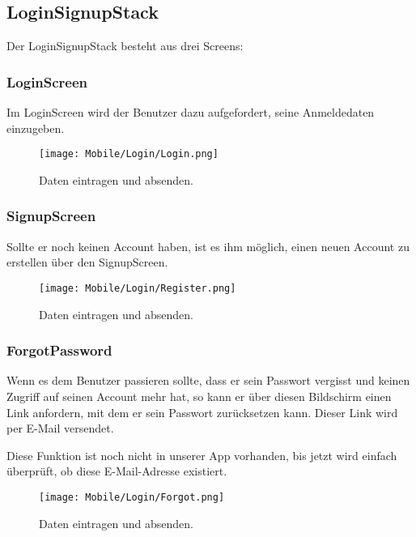 \subsection{LoginSignupStack}
Der LoginSignupStack besteht aus drei Screens:

\subsubsection{LoginScreen}
Im LoginScreen wird der Benutzer dazu aufgefordert, seine Anmeldedaten einzugeben.

\begin{figure}[H]
  \begin{center}
    \texttt{[image: Mobile/Login/Login.png]}
    \caption{Daten eintragen und absenden.}
  \end{center}
\end{figure}

\subsubsection{SignupScreen}
Sollte er noch keinen Account haben, ist es ihm möglich, einen neuen Account zu erstellen über den
SignupScreen.

\begin{figure}[H]
  \begin{center}
    \texttt{[image: Mobile/Login/Register.png]}
    \caption{Daten eintragen und absenden.}
  \end{center}
\end{figure}

\subsubsection{ForgotPassword}
Wenn es dem Benutzer passieren sollte, dass er sein Passwort vergisst und keinen Zugriff auf seinen
Account mehr hat, so kann er über diesen Bildschirm einen Link anfordern, mit dem er sein Passwort
zurücksetzen kann. Dieser Link wird per E-Mail versendet.

Diese Funktion ist noch nicht in unserer App vorhanden, bis jetzt wird einfach überprüft, ob diese
E-Mail-Adresse existiert.

\begin{figure}[H]
  \begin{center}
    \texttt{[image: Mobile/Login/Forgot.png]}
    \caption{Daten eintragen und absenden.}
  \end{center}
\end{figure}
